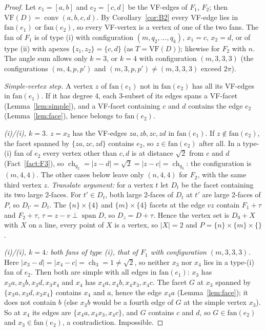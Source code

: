 \documentclass[11pt]{article}
\theoremstyle{definition}
\theoremstyle{remark}
\newcommand{\VF}{\mathrm{VF}}
\newcommand{\conv}{\operatorname{conv}}
\newcommand{\spn}{\operatorname{span}}
\newcommand{\ch}{\operatorname{ch}}
\begin{document}
\begin{proof}
Let $e_1=[a,b]$ and $e_2=[c,d]$ be the VF-edges of $F_1$, $F_2$; then
$\VF(D)=\conv(a,b,c,d)$. By Corollary~\ref{cor:B2} every VF-edge lies in
$\mathrm{fan}(e_1)$ or $\mathrm{fan}(e_2)$, so every VF-vertex is a vertex of
one of the two fans. The fan of $F_1$ is of type (i) with configuration
$(m,q_2,\dots,q_k)$, $x_1=c$, $x_2=d$, or of type (ii) with apexes
$\{z_1,z_2\}=\{c,d\}$ (as $T=\VF(D)$); likewise for $F_2$ with $n$. The angle
sum allows only $k=3$, or $k=4$ with configuration $(m,3,3,3)$ (the
configurations $(m,4,p,p')$ and $(m,3,p,p')\ne(m,3,3,3)$ exceed $2\pi$).

\emph{Simple-vertex step.} A vertex $z$ of $\mathrm{fan}(e_1)$ not in
$\mathrm{fan}(e_2)$ has all its VF-edges in $\mathrm{fan}(e_1)$. If it has
degree 4, each 3-subset of its edges spans a VF-facet
(Lemma~\ref{lem:simple}), and a VF-facet containing $c$ and $d$ contains
the edge $e_2$ (Lemma~\ref{lem:face}), hence belongs to $\mathrm{fan}(e_2)$.

\emph{(i)/(i), $k=3$.} $z=x_3$ has the VF-edges $za,zb,zc,zd$ in
$\mathrm{fan}(e_1)$. If $z\notin\mathrm{fan}(e_2)$, the facet spanned by
$\{za,zc,zd\}$ contains $e_2$, so $z\in\mathrm{fan}(e_2)$ after all. In a
type-(i) fan of $e_2$ every vertex other than $c,d$ is at distance $\sqrt2$
from $c$ and $d$ (Fact~\ref{fact:F3}), so
$\ch_{q_2}=|z-d|=\sqrt2=|z-c|=\ch_{q_3}$: the configuration is $(m,4,4)$. The other cases below leave only $(n,4,4)$ for $F_2$, with the same third vertex $z$. \emph{Translate argument:} for a vertex $t$ let $D_t$ be the
facet containing its two large 2-faces. For $t'\in D_t$, both large 2-faces
of $D_t$ at $t'$ are large 2-faces of $P$, so $D_{t'}=D_t$. The
$\{n\}\times\{4\}$ and $\{m\}\times\{4\}$ facets at the edge $vz$ contain
$F_1+\tau$ and $F_2+\tau$, $\tau=z-v\perp\spn D$, so $D_z=D+\tau$. Hence the
vertex set is $D_0+X$ with $X$ on a line, every point of $X$ is a vertex, so
$|X|=2$ and $P=\{n\}\times\{m\}\times\{\}$.

\emph{(i)/(i), $k=4$: both fans of type (i), that of $F_1$ with
configuration $(m,3,3,3)$.} Here
$|x_3-d|=|x_4-c|=\ch_3=1\ne\sqrt2$, so neither $x_3$ nor $x_4$ lies in a
type-(i) fan of $e_2$. Then both are simple with all edges in
$\mathrm{fan}(e_1)$: $x_3$ has $x_3a,x_3b,x_3d,x_3x_4$ and $x_4$ has
$x_4a,x_4b,x_4x_3,x_4c$. The facet $G$ at $x_3$ spanned by
$\{x_3a,x_3d,x_3x_4\}$ contains $x_4$ and $a$, hence the edge $x_4a$
(Lemma~\ref{lem:face}); it does not contain $b$ (else $x_3b$ would be a
fourth edge of $G$ at the simple vertex $x_3$). So at $x_4$ its edges are
$\{x_4a,x_4x_3,x_4c\}$, and $G$ contains $c$ and $d$, so $G\in\mathrm{fan}(e_2)$
and $x_3\in\mathrm{fan}(e_2)$, a contradiction. Impossible.


\end{proof}
\end{document}
